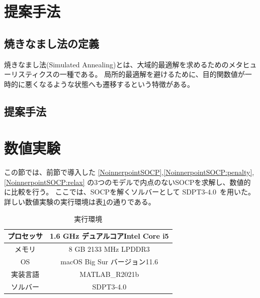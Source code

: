 \documentclass[11pt,a4paper,dvipdfmx,titlepage,uplatex]{jsarticle}
\theoremstyle{mystyle}
\newcommand{\0}{\mathbf{0}}
\begin{document}
\section{提案手法}\label{sec:SimulatedAnnealing}
\subsection{焼きなまし法の定義}

焼きなまし法(Simulated Annealing)とは、大域的最適解を求めるためのメタヒューリスティクスの一種である。 局所的最適解を避けるために、目的関数値が一時的に悪くなるような状態へも遷移するという特徴がある。
\subsection{提案手法}
%
\section{数値実験}\label{sec:Numerical_Experience}
この節では、前節で導入した
\eqref{NoinnerpointSOCP},\eqref{NoinnerpointSOCP:penalty},\eqref{NoinnerpointSOCP:relax}
の3つのモデルで内点のないSOCPを求解し、数値的に比較を行う。
ここでは、SOCPを解くソルバーとして
SDPT3-4.0~\cite{toh2012implementation}を用いた。
詳しい数値実験の実行環境は表\ref{table:Execution_environment}の通りである。
\begin{table}[hbtp]
  \caption{実行環境}
  \label{table:Execution_environment}
  \centering
  \begin{tabular}{|c|c|}
    \hline
    プロセッサ  & 1.6 GHz デュアルコアIntel Core i5 \\
    \hline
    メモリ  & 8 GB 2133 MHz LPDDR3 \\
    \hline
    OS  & macOS Big Sur バージョン11.6 \\
    \hline
    実装言語  &  MATLAB\_R2021b \\
    \hline
    ソルバー & SDPT3-4.0 \\
    \hline
  \end{tabular}
\end{table}
\end{document}
